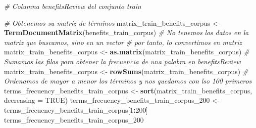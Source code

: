 \documentclass[spanish,]{article}
\newenvironment{Shaded}{\begin{snugshade}}{\end{snugshade}}
\newcommand{\KeywordTok}[1]{\textcolor[rgb]{0.13,0.29,0.53}{\textbf{#1}}}
\newcommand{\DataTypeTok}[1]{\textcolor[rgb]{0.13,0.29,0.53}{#1}}
\newcommand{\DecValTok}[1]{\textcolor[rgb]{0.00,0.00,0.81}{#1}}
\newcommand{\StringTok}[1]{\textcolor[rgb]{0.31,0.60,0.02}{#1}}
\newcommand{\CommentTok}[1]{\textcolor[rgb]{0.56,0.35,0.01}{\textit{#1}}}
\newcommand{\OtherTok}[1]{\textcolor[rgb]{0.56,0.35,0.01}{#1}}
\newcommand{\OperatorTok}[1]{\textcolor[rgb]{0.81,0.36,0.00}{\textbf{#1}}}
\newcommand{\NormalTok}[1]{#1}
\begin{document}
\begin{Shaded}
\begin{Highlighting}[]
\CommentTok{# Columna benefitsReview del conjunto train}

\CommentTok{# Obtenemos su matriz de términos}
\NormalTok{matrix_train_benefits_corpus <-}\StringTok{ }\KeywordTok{TermDocumentMatrix}\NormalTok{(benefits_train_corpus)}
\CommentTok{# No tenemos los datos en la matriz que buscamos, sino en un vector}
\CommentTok{# por tanto, lo convertimos en matriz}
\NormalTok{matrix_train_benefits_corpus <-}\StringTok{ }\KeywordTok{as.matrix}\NormalTok{(matrix_train_benefits_corpus)}
\CommentTok{# Sumamos las filas para obtener la frecuencia de una palabra en benefitsReview}
\NormalTok{matrix_train_benefits_corpus <-}\StringTok{ }\KeywordTok{rowSums}\NormalTok{(matrix_train_benefits_corpus)}
\CommentTok{# Ordenamos de mayor a menor los términos y nos quedamos con lso 100 primeros}
\NormalTok{terms_frecuency_benefits_train_corpus <-}\StringTok{ }\KeywordTok{sort}\NormalTok{(matrix_train_benefits_corpus, }\DataTypeTok{decreasing =} \OtherTok{TRUE}\NormalTok{)}
\NormalTok{terms_frecuency_benefits_train_corpus_}\DecValTok{200}\NormalTok{ <-}\StringTok{ }\NormalTok{terms_frecuency_benefits_train_corpus[}\DecValTok{1}\OperatorTok{:}\DecValTok{200}\NormalTok{]}
\NormalTok{terms_frecuency_benefits_train_corpus_}\DecValTok{200}
\end{Highlighting}
\end{Shaded}
\end{document}

